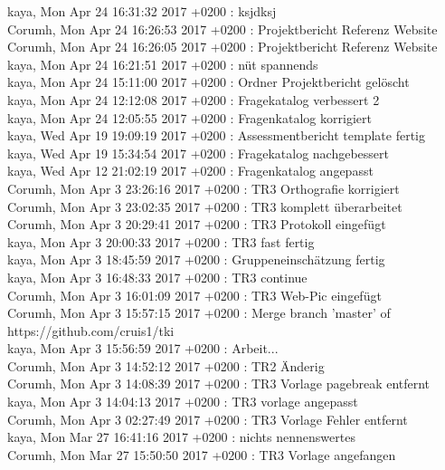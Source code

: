 kaya, Mon Apr 24 16:31:32 2017 +0200 : ksjdksj \\
Corumh, Mon Apr 24 16:26:53 2017 +0200 : Projektbericht Referenz Website \\
Corumh, Mon Apr 24 16:26:05 2017 +0200 : Projektbericht Referenz Website \\
kaya, Mon Apr 24 16:21:51 2017 +0200 : nüt spannends \\
kaya, Mon Apr 24 15:11:00 2017 +0200 : Ordner Projektbericht gelöscht \\
kaya, Mon Apr 24 12:12:08 2017 +0200 : Fragekatalog verbessert 2 \\
kaya, Mon Apr 24 12:05:55 2017 +0200 : Fragenkatalog korrigiert \\
kaya, Wed Apr 19 19:09:19 2017 +0200 : Assessmentbericht template fertig \\
kaya, Wed Apr 19 15:34:54 2017 +0200 : Fragekatalog nachgebessert \\
kaya, Wed Apr 12 21:02:19 2017 +0200 : Fragenkatalog angepasst \\
Corumh, Mon Apr 3 23:26:16 2017 +0200 : TR3 Orthografie korrigiert \\
Corumh, Mon Apr 3 23:02:35 2017 +0200 : TR3 komplett überarbeitet \\
Corumh, Mon Apr 3 20:29:41 2017 +0200 : TR3 Protokoll eingefügt \\
kaya, Mon Apr 3 20:00:33 2017 +0200 : TR3 fast fertig \\
kaya, Mon Apr 3 18:45:59 2017 +0200 : Gruppeneinschätzung fertig \\
kaya, Mon Apr 3 16:48:33 2017 +0200 : TR3 continue \\
Corumh, Mon Apr 3 16:01:09 2017 +0200 : TR3 Web-Pic eingefügt \\
Corumh, Mon Apr 3 15:57:15 2017 +0200 : Merge branch 'master' of https://github.com/cruis1/tki \\
kaya, Mon Apr 3 15:56:59 2017 +0200 : Arbeit... \\
Corumh, Mon Apr 3 14:52:12 2017 +0200 : TR2 Änderig\\
Corumh, Mon Apr 3 14:08:39 2017 +0200 : TR3 Vorlage pagebreak entfernt\\
kaya, Mon Apr 3 14:04:13 2017 +0200 : TR3 vorlage angepasst\\
Corumh, Mon Apr 3 02:27:49 2017 +0200 : TR3 Vorlage Fehler entfernt\\
kaya, Mon Mar 27 16:41:16 2017 +0200 : nichts nennenswertes\\
Corumh, Mon Mar 27 15:50:50 2017 +0200 : TR3 Vorlage angefangen\\
